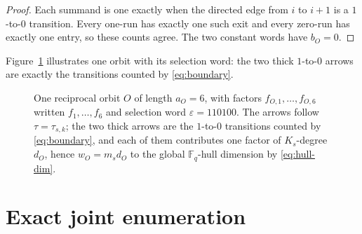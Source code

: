 \documentclass[10pt,a4paper]{article}
\newcommand{\F}{\mathbb F}
\numberwithin{equation}{section}
\theoremstyle{plain}
\theoremstyle{definition}
\theoremstyle{remark}
\begin{document}
\begin{proof}
Each summand is one exactly when the directed edge from $i$ to $i+1$ is a
$1$-to-$0$ transition. Every one-run has exactly one such exit and every zero-run
has exactly one entry, so these counts agree. The two constant words have
$b_O=0$.
\end{proof}

Figure~\ref{fig:orbit} illustrates one orbit with its selection word: the two
thick $1$-to-$0$ arrows are exactly the transitions counted by
\eqref{eq:boundary}.

\begin{figure}[ht]
\centering
{}
\caption{One reciprocal orbit $O$ of length $a_O=6$, with factors
$f_{O,1},\dots,f_{O,6}$ written $f_1,\dots,f_6$ and selection word
$\varepsilon=110100$. The arrows follow $\tau=\tau_{s,k}$; the two thick arrows
are the $1$-to-$0$ transitions counted by \eqref{eq:boundary}, and each of them
contributes one factor of $K_s$-degree $d_O$, hence $w_O=m_sd_O$ to the global
$\F_q$-hull dimension by \eqref{eq:hull-dim}.}
\label{fig:orbit}
\end{figure}

\section{Exact joint enumeration}\label{sec:enumeration}
\end{document}
